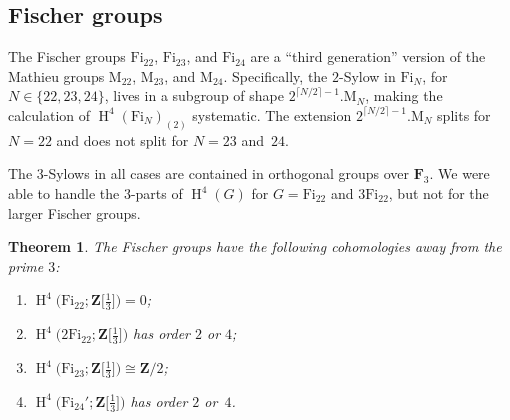 \documentclass[pdftex]{sigma}
\numberwithin{equation}{section}
\newtheorem{Theorem}{Theorem}[section]
\newcommand\bF{\mathbf F}
\newcommand\bZ{\mathbf Z}
\newcommand\rM{\mathrm M}
\DeclareMathOperator\homology{H}
\renewcommand\H{\homology}
\newcommand\<\langle
\renewcommand\>\rangle
\newcommand\Fi{\mathrm{Fi}}
\begin{document}
\subsection{Fischer groups}

The Fischer groups $\Fi_{22}$, $\Fi_{23}$, and $\Fi_{24}$ are a ``third generation'' version of the Mathieu groups $\rM_{22}$, $\rM_{23}$, and $\rM_{24}$. Specifically, the $2$-Sylow in $\Fi_N$, for $N \in \{22,23,24\}$, lives in a subgroup of shape $2^{\lceil N/2\rceil - 1}.\rM_N$, making the calculation of $\H^4(\Fi_N)_{(2)}$ systematic. The extension $2^{\lceil N/2\rceil - 1}.\rM_N$ splits for $N = 22$ and does not split for $N = 23$ and~$24$.

The $3$-Sylows in all cases are contained in orthogonal groups over $\bF_3$. We were able to handle the $3$-parts of $\H^4(G)$ for $G = \Fi_{22}$ and $3\Fi_{22}$, but not for the larger Fischer groups.

\begin{Theorem}\label{thm.fi} The Fischer groups have the following cohomologies away from the prime $3$:
 \begin{enumerate}\itemsep=0pt
 \item[$1)$] $\H^4\big(\Fi_{22}; \bZ\big[\frac13\big]\big) = 0$; %
 \item[$2)$] $\H^4\big(2\Fi_{22}; \bZ\big[\frac13\big]\big)$ has order $2$ or $4$; %
 \item[$3)$] $\H^4\big(\Fi_{23};\bZ\big[\frac13\big]\big) \cong \bZ/2$; %
 \item[$4)$] $\H^4\big(\Fi_{24}'; \bZ\big[\frac13\big]\big)$ has order $2$ or~$4$. %
 \end{enumerate}
\end{Theorem}
\end{document}
